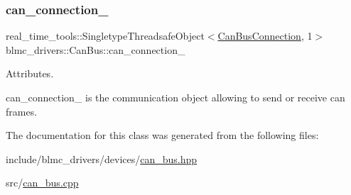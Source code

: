 \subsubsection{\texorpdfstring{can\+\_\+connection\+\_\+}{can\_connection\_}}
{\footnotesize\ttfamily real\+\_\+time\+\_\+tools\+::\+Singletype\+Threadsafe\+Object$<$\hyperlink{classblmc__drivers_1_1CanBusConnection}{Can\+Bus\+Connection}, 1$>$ blmc\+\_\+drivers\+::\+Can\+Bus\+::can\+\_\+connection\+\_\+\hspace{0.3cm}{\ttfamily [private]}}



Attributes. 

can\+\_\+connection\+\_\+ is the communication object allowing to send or receive can frames. 

The documentation for this class was generated from the following files\+:\begin{DoxyCompactItemize}
\item 
include/blmc\+\_\+drivers/devices/\hyperlink{can__bus_8hpp}{can\+\_\+bus.\+hpp}\item 
src/\hyperlink{can__bus_8cpp}{can\+\_\+bus.\+cpp}\end{DoxyCompactItemize}
